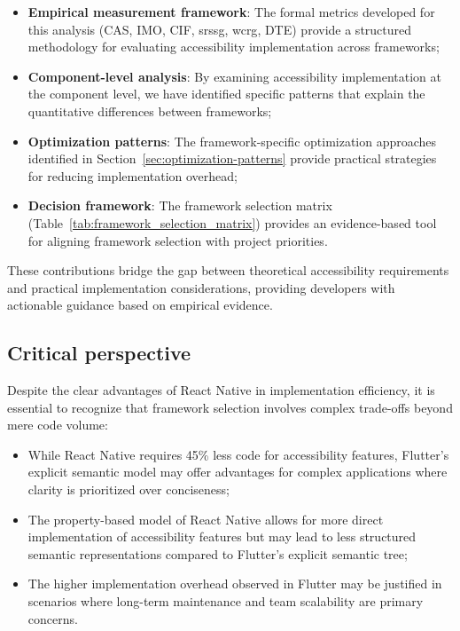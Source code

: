 \begin{itemize}
    \item \textbf{Empirical measurement framework}: The formal metrics developed for this analysis (CAS, IMO, CIF, \gls{srssg}, \gls{wcrg}, DTE) provide a structured methodology for evaluating accessibility implementation across frameworks;

    \item \textbf{Component-level analysis}: By examining accessibility implementation at the component level, we have identified specific patterns that explain the quantitative differences between frameworks;

    \item \textbf{Optimization patterns}: The framework-specific optimization approaches identified in Section~\ref{sec:optimization-patterns} provide practical strategies for reducing implementation overhead;

    \item \textbf{Decision framework}: The framework selection matrix (Table~\ref{tab:framework_selection_matrix}) provides an evidence-based tool for aligning framework selection with project priorities.
\end{itemize}

These contributions bridge the gap between theoretical accessibility requirements and practical implementation considerations, providing developers with actionable guidance based on empirical evidence.

\subsection{Critical perspective}
\label{subsec:conclusion-critical}

Despite the clear advantages of React Native in implementation efficiency, it is essential to recognize that framework selection involves complex trade-offs beyond mere code volume:

\begin{itemize}
    \item While React Native requires 45\% less code for accessibility features, Flutter's explicit semantic model may offer advantages for complex applications where clarity is prioritized over conciseness;

    \item The property-based model of React Native allows for more direct implementation of accessibility features but may lead to less structured semantic representations compared to Flutter's explicit semantic tree;

    \item The higher implementation overhead observed in Flutter may be justified in scenarios where long-term maintenance and team scalability are primary concerns.
\end{itemize}


